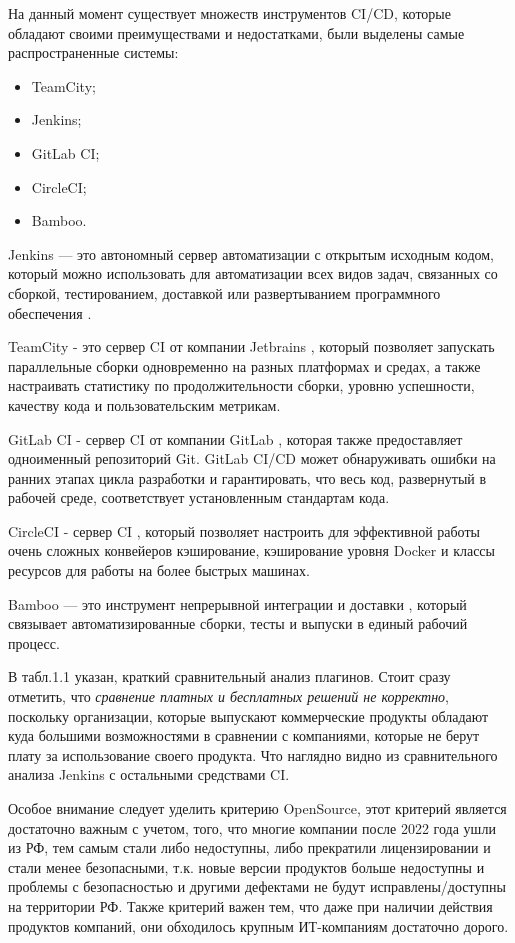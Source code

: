 На данный момент существует множеств инструментов CI/CD, которые обладают своими преимуществами и недостатками, были выделены самые распространенные системы:

\begin{itemize}
	\item TeamCity;
	\item Jenkins;
	\item GitLab CI;
	\item CircleCI;
	\item Bamboo.
\end{itemize}




Jenkins — это автономный сервер автоматизации с открытым исходным кодом, который можно использовать для автоматизации всех видов задач, связанных со сборкой, тестированием, доставкой или развертыванием программного обеспечения \cite{jenkins}.

TeamCity - это сервер CI от компании Jetbrains  \cite{tc}, который позволяет запускать параллельные сборки одновременно на разных платформах и средах, а также настраивать статистику по продолжительности сборки, уровню успешности, качеству кода и пользовательским метрикам.

GitLab CI - сервер CI от компании GitLab \cite{gitlab}, которая также предоставляет одноименный репозиторий Git. GitLab CI/CD может обнаруживать ошибки на ранних этапах цикла разработки и гарантировать, что весь код, развернутый в рабочей среде, соответствует установленным стандартам кода.

CircleCI - сервер CI \cite{circle}, который позволяет настроить для эффективной работы очень сложных конвейеров кэширование, кэширование уровня Docker и классы ресурсов для работы на более быстрых машинах.

Bamboo — это инструмент непрерывной интеграции и доставки  \cite{bamboo}, который связывает автоматизированные сборки, тесты и выпуски в единый рабочий процесс.

В табл.1.1 указан, краткий сравнительный анализ плагинов. Стоит сразу отметить, что \textit{сравнение платных и бесплатных решений не корректно}, поскольку организации, которые выпускают коммерческие продукты обладают куда большими возможностями в сравнении с компаниями, которые не берут плату за использование своего продукта. Что наглядно видно из сравнительного анализа Jenkins с остальными средствами CI.

Особое внимание следует уделить критерию OpenSource, этот критерий является достаточно важным с учетом, того, что многие компании после 2022 года ушли из РФ, тем самым стали либо недоступны, либо прекратили лицензировании и стали менее безопасными, т.к. новые версии продуктов больше недоступны и проблемы с безопасностью и другими дефектами не будут исправлены/доступны на территории РФ. Также критерий важен тем, что даже при наличии действия продуктов компаний, они обходилось крупным ИТ-компаниям достаточно дорого.

